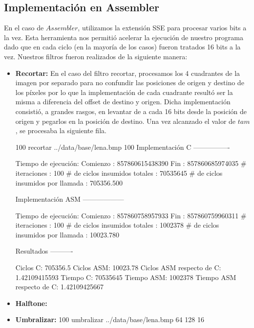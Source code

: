 \documentclass[10pt, a4paper]{article}
\begin{document}
\subsection{Implementación en Assembler}
En el caso de $Assembler$, utilizamos la extensión SSE para procesar varios bits a la vez. Esta herramienta nos permitió acelerar la ejecución de nuestro programa dado que en cada ciclo (en la mayoría de los casos) fueron tratados 16 bits a la vez.\newline
Nuestros filtros fueron realizados de la siguiente manera:
\begin{itemize}
\item {\textbf{Recortar:}}
En el caso del filtro recortar, procesamos los 4 cuadrantes de la imagen por separado para no confundir las posiciones de origen y destino de los píxeles por lo que la implementación de cada cuadrante resultó ser la misma a diferencia del offset de destino y origen.\newline
Dicha implementación consistió, a grandes rasgos, en levantar de a cada 16 bits desde la posición de origen y pegarlos en la posición de destino. Una vez alcanzado el valor de $tam$, se procesaba la siguiente fila.

100 recortar ../data/base/lena.bmp 100
Implementación C
----------------

Tiempo de ejecución:
  Comienzo                          : 857860615438390
  Fin                               : 857860685974035
  # iteraciones                     : 100
  # de ciclos insumidos totales     : 70535645
  # de ciclos insumidos por llamada : 705356.500

Implementación ASM
------------------

Tiempo de ejecución:
  Comienzo                          : 857860758957933
  Fin                               : 857860759960311
  # iteraciones                     : 100
  # de ciclos insumidos totales     : 1002378
  # de ciclos insumidos por llamada : 10023.780

Resultados
----------

Ciclos C:                 705356.5
Ciclos ASM:               10023.78
Ciclos ASM respecto de C: 1.42109415593%
Tiempo C:                 70535645
Tiempo ASM:               1002378
Tiempo ASM respecto de C: 1.42109425667%


\item {\textbf{Halftone:}}
\item {\textbf{Umbralizar:}}
100 umbralizar ../data/base/lena.bmp 64 128 16


\end{itemize}
\end{document}
